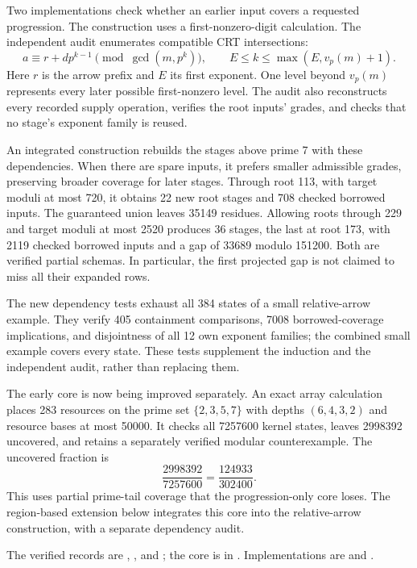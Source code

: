 \documentclass[11pt]{article}
\begin{document}
Two implementations check whether an earlier input covers a requested
progression. The construction uses a first-nonzero-digit calculation.
The independent audit enumerates compatible CRT intersections:
\[
 a\equiv r+d p^{k-1}\pmod{\gcd(m,p^k)},\qquad
 E\leq k\leq\max(E,v_p(m)+1).
\]
Here $r$ is the arrow prefix and $E$ its first exponent. One level beyond
$v_p(m)$ represents every later possible first-nonzero level. The audit
also reconstructs every recorded supply operation, verifies the root
inputs' grades, and checks that no stage's exponent family is reused.

An integrated construction rebuilds the stages above prime 7 with these
dependencies. When there are spare inputs, it prefers smaller admissible
grades, preserving broader coverage for later stages. Through root 113,
with target moduli at most 720, it obtains 22 new root stages and 708
checked borrowed inputs. The guaranteed union leaves 35149 residues.
Allowing roots through 229 and target moduli at most 2520 produces 36
stages, the last at root 173, with 2119 checked borrowed inputs and a gap
of 33689 modulo 151200. Both are verified partial schemas. In particular,
the first projected gap is not claimed to miss all their expanded rows.

The new dependency tests exhaust all 384 states of a small relative-arrow
example. They verify 405 containment comparisons, 7008 borrowed-coverage
implications, and disjointness of all 12 own exponent families; the combined
small example covers every state. These tests supplement the induction
and the independent audit, rather than replacing them.

The early core is now being improved separately. An exact array calculation
places 283 resources on the prime set $\{2,3,5,7\}$ with depths
$(6,4,3,2)$ and resource bases at most 50000. It checks all 7257600 kernel
states, leaves 2998392 uncovered, and retains a separately verified modular
counterexample. The uncovered fraction is
\[
 \frac{2998392}{7257600}=\frac{124933}{302400}.
\]
This uses partial prime-tail coverage that the progression-only core loses.
The region-based extension below integrates this core into the
relative-arrow construction, with a separate dependency audit.

The verified records are ,
, and
; the core is in
. Implementations are
 and .
\end{document}
